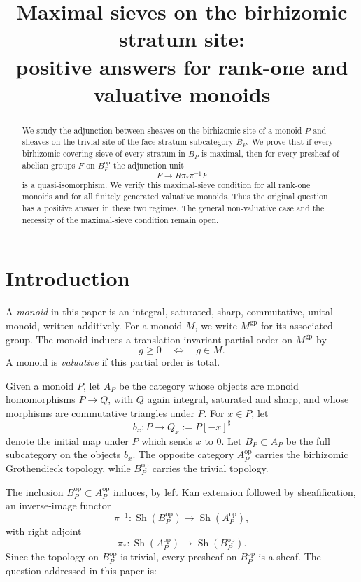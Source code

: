 \documentclass[12pt]{article}
\theoremstyle{definition}
\theoremstyle{remark}
\numberwithin{equation}{section}
\newcommand{\gp}{\mathrm{gp}}
\newcommand{\op}{\mathrm{op}}
\newcommand{\Sh}{\operatorname{Sh}}
\begin{document}
\title{Maximal sieves on the birhizomic stratum site:\\
positive answers for rank-one and valuative monoids}
\author{}
\date{}
\maketitle

\begin{abstract}
We study the adjunction between sheaves on the birhizomic site of a monoid \(P\) and sheaves on the trivial site of the face-stratum subcategory \(B_P\).  We prove that if every birhizomic covering sieve of every stratum in \(B_P\) is maximal, then for every presheaf of abelian groups \(F\) on \(B_P^{\op}\) the adjunction unit
\[
F \longrightarrow R\pi_*\pi^{-1}F
\]
is a quasi-isomorphism.  We verify this maximal-sieve condition for all rank-one monoids and for all finitely generated valuative monoids.  Thus the original question has a positive answer in these two regimes.  The general non-valuative case and the necessity of the maximal-sieve condition remain open.
\end{abstract}

\tableofcontents

\section{Introduction}

A \emph{monoid} in this paper is an integral, saturated, sharp, commutative, unital monoid, written additively.  For a monoid \(M\), we write \(M^{\gp}\) for its associated group.  The monoid induces a translation-invariant partial order on \(M^{\gp}\) by
\[
g\geq 0 \quad\Longleftrightarrow\quad g\in M.
\]
A monoid is \emph{valuative} if this partial order is total.

Given a monoid \(P\), let \(A_P\) be the category whose objects are monoid homomorphisms \(P\to Q\), with \(Q\) again integral, saturated and sharp, and whose morphisms are commutative triangles under \(P\).  For \(x\in P\), let
\[
b_x : P \longrightarrow Q_x := P[-x]^\sharp
\]
denote the initial map under \(P\) which sends \(x\) to \(0\).  Let \(B_P\subset A_P\) be the full subcategory on the objects \(b_x\).  The opposite category \(A_P^{\op}\) carries the birhizomic Grothendieck topology, while \(B_P^{\op}\) carries the trivial topology.

The inclusion \(B_P^{\op}\subset A_P^{\op}\) induces, by left Kan extension followed by sheafification, an inverse-image functor
\[
\pi^{-1}:\Sh(B_P^{\op})\longrightarrow \Sh(A_P^{\op}),
\]
with right adjoint
\[
\pi_*:\Sh(A_P^{\op})\longrightarrow \Sh(B_P^{\op}).
\]
Since the topology on \(B_P^{\op}\) is trivial, every presheaf on \(B_P^{\op}\) is a sheaf.  The question addressed in this paper is:
\end{document}
